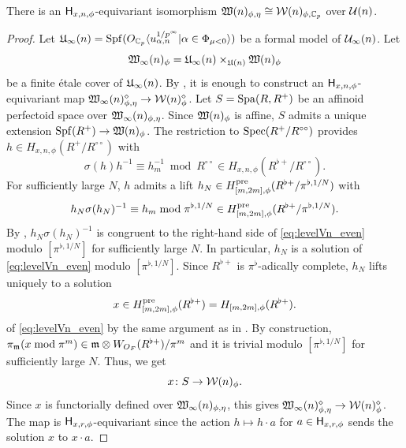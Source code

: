 \documentclass[12pt,reqno]{amsart}
\begin{document}
\begin{prop} \label{prop:good_reduction_even}
    There is an ${\mathsf{H}}_{x, n, \phi}$-equivariant isomorphism ${\mathfrak{W}}(n)_{\phi, \eta} \cong {\mathcal{W}}(n)_{\phi, \mathbb{C}_p}$ over ${\mathcal{U}}(n)$. 
\end{prop}
\begin{proof}
    Let ${\mathfrak{U}}_\infty(n) = {\operatorname{Spf}}(O_{\mathbb{C}_p}\langle u_{\alpha,n}^{1/p^\infty} \vert \alpha \in \Phi_{\mu < 0} \rangle )$ be a formal model of ${\mathcal{U}}_\infty(n)$. Let 
    \[
        {\mathfrak{W}}_\infty(n)_\phi = {\mathfrak{U}}_\infty(n)\times_{{\mathfrak{U}}(n)} {\mathfrak{W}}(n)_\phi
    \]
    be a finite \'{e}tale cover of ${\mathfrak{U}}_\infty(n)$. By , it is enough to construct an ${\mathsf{H}}_{x, n, \phi}$-equivariant map ${\mathfrak{W}}_\infty(n)_{\phi, \eta}^\diamond \to {\mathcal{W}}(n)^\diamond_\phi$. Let $S = {\operatorname{Spa}}(R,R^+)$ be an affinoid perfectoid space over ${\mathfrak{W}}_\infty(n)_{\phi, \eta}$. Since ${\mathfrak{W}}(n)_\phi$ is affine, $S$ admits a unique extension ${\operatorname{Spf}}(R^+) \to {\mathfrak{W}}(n)_\phi$. The restriction to ${\operatorname{Spec}}(R^+/R^{\circ \circ})$ provides $h \in H_{x, n, \phi}(R^+/R^{\circ \circ})$ with
    \[
       \sigma(h) h^{-1} \equiv h_m^{-1} \bmod R^{\circ \circ}
       \in H_{x, n, \phi}(R^{\flat +}/R^{\circ \circ}). 
    \]
    For sufficiently large $N$, $h$ admits a lift $h_N \in H_{[m, 2m], \phi}^{\operatorname{pre}}(R^{\flat +} / \pi^{\flat, 1 / N})$ with 
    \[
        h_N \sigma(h_N)^{-1} \equiv h_m \bmod \pi^{\flat, 1 / N}  \in H_{[m, 2m], \phi}^{\operatorname{pre}}(R^{\flat +} / \pi^{\flat, 1 / N}). 
    \]
    By , $h_N \sigma(h_N)^{-1}$ is congruent to the right-hand side of \eqref{eq:levelVn_even} modulo $[\pi^{\flat, 1/N}]$ for sufficiently large $N$. In particular, $h_N$ is a solution of \eqref{eq:levelVn_even} modulo $[\pi^{\flat, 1/N}]$. Since $R^{\flat +}$ is $\pi^{\flat}$-adically complete, $h_N$ lifts uniquely to a solution 
    \[
        x \in H_{[m, 2m], \phi}^{\operatorname{pre}}(R^{\flat +}) = H_{[m, 2m], \phi}(R^{\flat +}). 
    \]
    of \eqref{eq:levelVn_even} by the same argument as in \cite[Lemma 3.5]{Tak25z}. By construction, $\pi_{{\mathfrak{m}}}(x \bmod \pi^m) \in {\mathfrak{m}} \otimes W_{O_F}(R^{\flat+}) / \pi^{m}$ and it is trivial modulo $[\pi^{\flat, 1 / N}]$ for sufficiently large $N$. Thus, we get
    \[
        x \colon S \to {\mathcal{W}}(n)_\phi. 
    \]
    Since $x$ is functorially defined over ${\mathfrak{W}}_\infty(n)_{\phi, \eta}$, this gives ${\mathfrak{W}}_\infty(n)_{\phi, \eta}^\diamond \to {\mathcal{W}}(n)_\phi^\diamond$. The map is ${\mathsf{H}}_{x, r, \phi}$-equivariant since the action $h \mapsto h \cdot a$ for $a \in {\mathsf{H}}_{x, r, \phi}$ sends the solution $x$ to $x \cdot a$.  
\end{proof}
\end{document}
